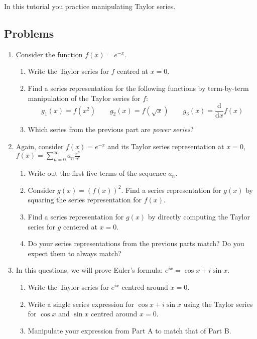 		\begin{objectives}
			In this tutorial you practice manipulating Taylor series.
		\end{objectives}

\subsection*{Problems}




\begin{enumerate}
    \item Consider the function $f(x)=e^{-x}$. 
    
    \begin{enumerate}
        \item Write the Taylor series for $f$ centred at $x=0$.
        \item Find a series representation for the following functions by term-by-term manipulation of the Taylor series for $f$:
        \[
            g_1(x)=f(x^2)\qquad g_2(x)=f(\sqrt{x})\qquad g_3(x)=\frac{\mathrm d}{\mathrm d x}f(x)
        \]
        \item Which series from the previous part are \emph{power series}?

    \end{enumerate}

    \item Again, consider $f(x)=e^{-x}$ and its Taylor series representation at $x=0$,
    $\displaystyle f(x)= \sum_{n=0}^\infty a_n \frac{x^n}{n!}$
    \begin{enumerate}
        \item Write out the first five terms of the sequence $a_n$.
        \item Consider $g(x)=(f(x))^2$.  Find a series representation for $g(x)$ by squaring the series representation for $f(x)$. 
        \item Find a series representation for $g(x)$ by directly computing the Taylor series for $g$ centered at $x=0$.
        \item Do your series representations from the previous parts match? Do you expect them to always match?
    \end{enumerate}

	\item In this questions, we will prove Euler's formula: $e^{ix} = \cos{x} + i\sin{x}$.
    \begin{enumerate}
        \item Write the Taylor series for $e^{ix}$ centred around $x=0$.
        \item Write a single series expression for $\cos{x} + i\sin{x}$ using the Taylor series for $\cos{x}$ and $\sin{x}$ centred around $x=0$.
        \item Manipulate your expression from Part A to match that of Part B.
    \end{enumerate}


\end{enumerate}

